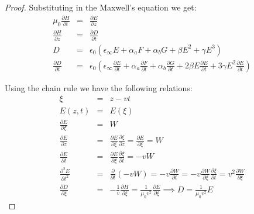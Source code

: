 \documentclass{article}[12pt]
\theoremstyle{plain}
\begin{document}
\begin{proof}
Substituting in the Maxwell's equation we get:
\begin{eqnarray}
\mu_0 \frac{\partial H}{\partial t} & = & \frac{\partial E}{\partial z} \\
\frac{\partial H}{\partial z} & = & \frac{\partial D}{\partial t} \\
D & = & \epsilon_0( \epsilon_\infty E + \alpha_a F + \alpha_b G + \beta E^2 + \gamma E^3) \label{eqn:D_pol}\\
\frac{\partial D}{\partial t} & = & \epsilon_0( \epsilon_\infty \frac{\partial E}{\partial t} + 
\alpha_a \frac{\partial F}{\partial t}
+ \alpha_b \frac{\partial G}{\partial t}
+2\beta E \frac{\partial E}{\partial t} + 3\gamma E^2\frac{\partial E}{\partial t}) \label{eqn:D_by_dt}
\end{eqnarray}

Using the chain rule we have the following relations:
\begin{eqnarray}
\xi & = & z - vt \\
E(z,t) & = & E(\xi) \\
\frac{\partial E}{\partial \xi} & = & W \\
\frac{\partial E}{\partial z} & = & \frac{\partial E}{\partial \xi} \frac{\partial \xi}{\partial z} = \frac{\partial E}{\partial \xi} = W \\
\frac{\partial E}{\partial t} & = & \frac{\partial E}{\partial \xi} \frac{\partial \xi}{\partial t} = -vW \\
\frac{\partial^2 E}{\partial t^2} & = & \frac{\partial}{\partial t} (-vW) = -v \frac{\partial W}{\partial t} = -v \frac{\partial W}{\partial \xi}\frac{\partial \xi}{\partial t} = v^2 \frac{\partial W}{\partial \xi} \\
\frac{\partial D}{\partial \xi} & = & -\frac{1}{v} \frac{\partial H}{\partial \xi} = 
\frac{1}{\mu_0 v^2}\frac{\partial E}{\partial \xi} \implies D = \frac{1}{\mu_0 v^2} E\label{eqn:Deqn}
\end{eqnarray}


\end{proof}
\end{document}
